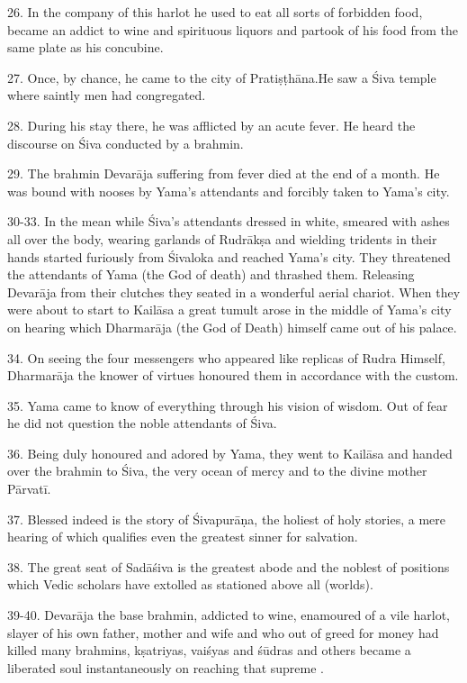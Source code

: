 26. In the company of this harlot he used to eat all sorts of forbidden food,
became an addict to wine and spirituous liquors and partook of his food from
the same plate as his concubine.

27. Once, by chance, he came to the city of Pratiṣṭhāna.He saw a Śiva temple
where saintly men had congregated.

28. During his stay there, he was afflicted by an acute fever. He heard
the discourse on Śiva conducted by a brahmin.

29. The brahmin Devarāja suffering from fever died at the end of a month. He was
bound with nooses by Yama’s attendants and forcibly taken to Yama’s city.

30-33. In the mean while Śiva’s attendants dressed in white, smeared with ashes
all over the body, wearing garlands of Rudrākṣa and wielding tridents in their
hands started furiously from Śivaloka and reached Yama’s city. They threatened
the attendants of Yama (the God of death) and thrashed them. Releasing Devarāja
from their clutches they seated in a wonderful aerial chariot. When they were
about to start to Kailāsa a great tumult arose in the middle of Yama’s city on
hearing which Dharmarāja (the God of Death) himself came out of his palace.

34. On seeing the four messengers who appeared like replicas of Rudra Himself,
Dharmarāja the knower of virtues honoured them in accordance with the custom.

35. Yama came to know of everything through his vision of wisdom. Out of fear he
did not question the noble attendants of Śiva.

36. Being duly honoured and adored by Yama, they went to Kailāsa and handed over
the brahmin to Śiva, the very ocean of mercy and to the divine mother Pārvatī.

37. Blessed indeed is the story of Śivapurāṇa, the holiest of holy stories,
a mere hearing of which qualifies even the greatest sinner for salvation.

38. The great seat of Sadāśiva is the greatest abode and the noblest of
positions which Vedic scholars have extolled as stationed above all 
(worlds).

39-40. Devarāja the base brahmin, addicted to wine, enamoured of a vile harlot,
slayer of his own father, mother and wife and who out of greed for money had
killed many brahmins, kṣatriyas, vaiśyas and śūdras and others became a
liberated soul instantaneously on reaching that supreme .
